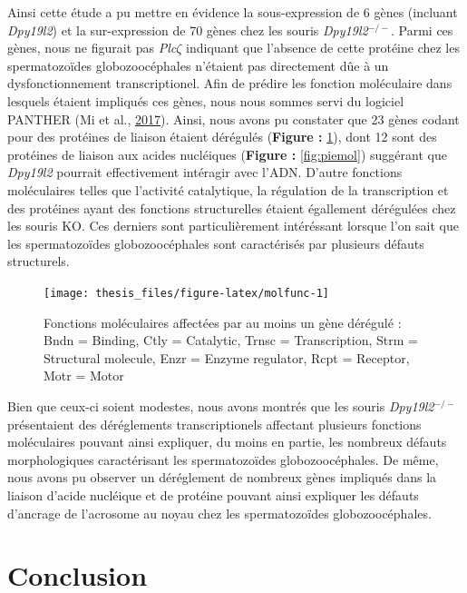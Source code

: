 \documentclass[12pt,twoside]{reedthesis}
\theoremstyle{definition}
\theoremstyle{definition}
\theoremstyle{remark}
\begin{document}
  Ainsi cette étude a pu mettre en évidence la sous-expression de 6 gènes
  (incluant \emph{Dpy19l2}) et la sur-expression de 70 gènes chez les
  souris \emph{Dpy19l2}\(^{-/-}\). Parmi ces gènes, nous ne figurait pas
  \emph{Plc}\(\zeta\) indiquant que l'absence de cette protéine chez les
  spermatozoïdes globozoocéphales n'étaient pas directement dûe à un
  dysfonctionnement transcriptionel. Afin de prédire les fonction
  moléculaire dans lesquels étaient impliqués ces gènes, nous nous sommes
  servi du logiciel PANTHER (Mi et al.,
  \protect\hyperlink{ref-Mi2017}{2017}). Ainsi, nous avons pu constater
  que 23 gènes codant pour des protéines de liaison étaient dérégulés
  (\textbf{Figure : }\ref{fig:molfunc}), dont 12 sont des protéines de
  liaison aux acides nucléiques (\textbf{Figure : }\ref{fig:piemol})
  suggérant que \emph{Dpy19l2} pourrait effectivement intéragir avec
  l'ADN. D'autre fonctions moléculaires telles que l'activité catalytique,
  la régulation de la transcription et des protéines ayant des fonctions
  structurelles étaient égallement dérégulées chez les souris KO. Ces
  derniers sont particulièrement intéréssant lorsque l'on sait que les
  spermatozoïdes globozoocéphales sont caractérisés par plusieurs défauts
  structurels.
  
  \begin{figure}
  
  {\centering \texttt{[image: thesis\_files/figure-latex/molfunc-1]} 
  
  }
  
  \caption[Fonctions moléculaires affectées par au moins un gène dérégulé]{Fonctions moléculaires affectées par au moins un gène dérégulé  :  Bndn = Binding, Ctly = Catalytic, Trnsc = Transcription, Strm = Structural molecule, Enzr = Enzyme regulator, Rcpt = Receptor, Motr = Motor}\label{fig:molfunc}
  \end{figure}
  
  Bien que ceux-ci soient modestes, nous avons montrés que les souris
  \emph{Dpy19l2}\(^{-/-}\) présentaient des déréglements transcriptionels
  affectant plusieurs fonctions moléculaires pouvant ainsi expliquer, du
  moins en partie, les nombreux défauts morphologiques caractérisant les
  spermatozoïdes globozoocéphales. De même, nous avons pu observer un
  déréglement de nombreux gènes impliqués dans la liaison d'acide
  nucléique et de protéine pouvant ainsi expliquer les défauts d'ancrage
  de l'acrosome au noyau chez les spermatozoïdes globozoocéphales.
  
  \section{Conclusion}\label{conclusion}
  
\end{document}
